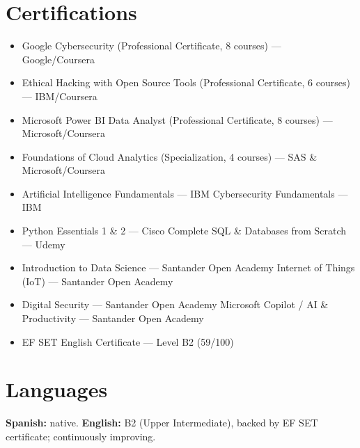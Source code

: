 \documentclass[11pt,a4paper]{article}
\begin{document}
\section{Certifications}
\begin{itemize}[itemsep=1pt]
  \item Google Cybersecurity (Professional Certificate, 8 courses) --- Google/Coursera
  \item Ethical Hacking with Open Source Tools (Professional Certificate, 6 courses) --- IBM/Coursera
  \item Microsoft Power BI Data Analyst (Professional Certificate, 8 courses) --- Microsoft/Coursera
  \item Foundations of Cloud Analytics (Specialization, 4 courses) --- SAS \& Microsoft/Coursera
  \item Artificial Intelligence Fundamentals --- IBM \hfill\textbullet\hfill Cybersecurity Fundamentals --- IBM
  \item Python Essentials 1 \& 2 --- Cisco \hfill\textbullet\hfill Complete SQL \& Databases from Scratch --- Udemy
  \item Introduction to Data Science --- Santander Open Academy \hfill\textbullet\hfill Internet of Things (IoT) --- Santander Open Academy
  \item Digital Security --- Santander Open Academy \hfill\textbullet\hfill Microsoft Copilot / AI \& Productivity --- Santander Open Academy
  \item EF SET English Certificate --- Level B2 (59/100)
\end{itemize}

\section{Languages}
\textbf{Spanish:} native. \qquad \textbf{English:} B2 (Upper Intermediate), backed by EF SET certificate; continuously improving.
\end{document}
